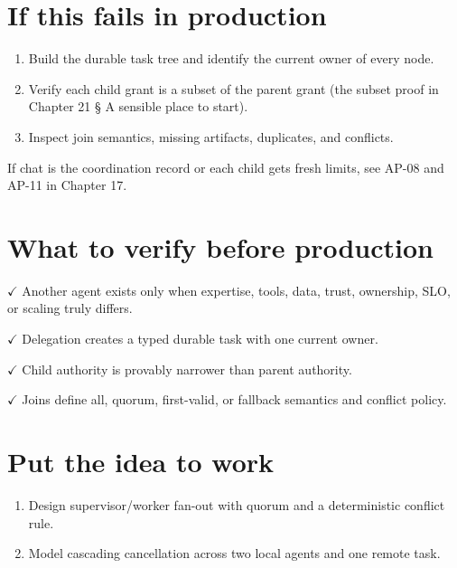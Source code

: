 \section{If this fails in production}

\begin{enumerate}

\item Build the durable task tree and identify the current owner of every node.

\item Verify each child grant is a subset of the parent grant (the subset proof in Chapter 21 § A sensible place to start).

\item Inspect join semantics, missing artifacts, duplicates, and conflicts.

\end{enumerate}

If chat is the coordination record or each child gets fresh limits, see AP-08 and AP-11 in Chapter 17.\par

\section{What to verify before production}

\textbf{\ensuremath{\checkmark}} Another agent exists only when expertise, tools, data, trust, ownership, SLO, or scaling truly differs.\par

\textbf{\ensuremath{\checkmark}} Delegation creates a typed durable task with one current owner.\par

\textbf{\ensuremath{\checkmark}} Child authority is provably narrower than parent authority.\par

\textbf{\ensuremath{\checkmark}} Joins define all, quorum, first-valid, or fallback semantics and conflict policy.\par

\section{Put the idea to work}

\begin{enumerate}

\item Design supervisor/worker fan-out with quorum and a deterministic conflict rule.

\item Model cascading cancellation across two local agents and one remote task.

\end{enumerate}

